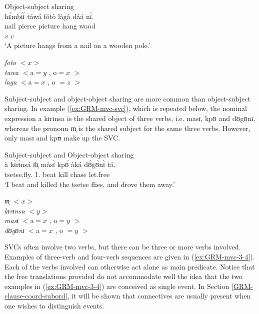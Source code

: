 \ea\label{ex:GRM-arg-sh-objsubj}{\rm Object-subject sharing}\\
\glll  hɛ̀mbɪ́ɪ́ táwá fótò làgà dáá nɪ́.\\
nail pierce picture hang wood  {\postp}\\
{} {\it v} {}  {\it v}\\
 \glt `A picture hangs from a nail on a wooden pole.'

{\it foto} $<x>$\\
{\it tawa} $<${\sc a}$ =  y$ ,  {\sc o}$=x$  $> $\\
{\it laga} $<${\sc a}$ = x$ , {\sc o} $= z $  $ >$\\
\z




Subject-subject and object-object sharing are more common than object-subject
sharing. In example
(\ref{ex:GRM-mvc-svc}), which is repeated below, the nominal expression {\sls a 
 kɪrɪnsa} is the shared object of three verbs, i.e. {\sls masɪ}, {\sls kpʊ} and 
{\sls dʊgʊnɪ}, whereas the pronoun {\sls m̩} is the shared subject for the same 
three
verbs. However, only {\sls masɪ} and {\sls kpʊ}  make up the SVC. 

\begin{exe}


\ex\label{ex:GRM-mvc-svc}{\rm Subject-subject and Object-object sharing}\\
\gll à  kɪ̀rɪ̀nsá   m̩̀   màsɪ̀   kpʊ́ àká dʊ̀gʊ̀nɪ̀ tá.\\
{\art}  tsetse.fly.{\pl}   {1.\sg}    beat   kill   {\conn} 
chase   let.free\\
\glt `I beat and killed the tsetse flies, and drove them away.'

{\it m̩} $<x>$\\
{\it kɪrɪnsa} $<y>$\\
{\it masɪ} $<${\sc a}$ =  x$ ,  {\sc o}$=y$  $> $\\
{\it dʊgʊnɪ} $<${\sc a}$ = x$ , {\sc o} $= y $  $ >$\\
 
\end{exe}

SVCs often involve two verbs, but there can be three or more verbs involved. 
Examples of three-verb and four-verb sequences are given in
(\ref{ex:GRM-mvc-3-4}). Each of the verbs involved can otherwise act alone as
main
predicate. Notice that the free translations provided do not accommodate well
the idea that
the two examples in (\ref{ex:GRM-mvc-3-4}) are conceived as single event.
In Section \ref{GRM-clause-coord-subord},  it will be shown that connectives
are usually present  when one wishes to distinguish events.



